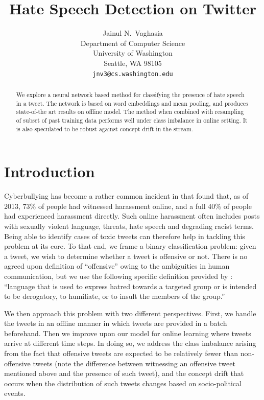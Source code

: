 \documentclass{article}
\title{Hate Speech Detection on Twitter}
\author{
    Jainul N.~Vaghasia\\
    Department of Computer Science\\
    University of Washington\\
    Seattle, WA 98105 \\
    \texttt{jnv3@cs.washington.edu}
  }
\begin{document}
  
  \maketitle

  \begin{abstract}
    We explore a neural network based method for classifying the presence of hate speech in a tweet.
    The network is based on word embeddings and mean pooling, and produces state-of-the art results on
    offline model. The method when combined with resampling of subset of past training data performs well
    under class imbalance in online setting. It is also speculated to be robust against concept drift in the stream.
  \end{abstract}
    
  \section{Introduction}
  Cyberbullying has become a rather common incident in that \citet{pew}
  found that, as of 2013, 73\% of people had witnessed harassment online, and a full
  40\% of people had experienced harassment directly. Such online harassment
  often includes posts with sexually violent language, threats, hate speech and degrading racist
  terms. Being able to identify cases of toxic tweets can therefore help in tackling this problem
  at its core. To that end, we frame a binary classification problem:
  given a tweet, we wish to determine whether a tweet is offensive or not. There is no
  agreed upon definition of ``offensive'' owing to the ambiguities in human communication, but we
  use the following specific definition provided by \citet{hateoffensive}: ``language that is used to express hatred towards
  a targeted group or is intended to be derogatory, to humiliate, or to insult the members of the group.''
  
  We then approach this problem with two different perspectives. First, we handle the tweets in
  an offline manner in which tweets are provided
  in a batch beforehand. Then we improve upon our model for online learning where
  tweets arrive at different time steps. In doing so, we address the class imbalance
  arising from the fact that offensive tweets are expected to be relatively fewer than non-offensive
  tweets (note the difference between witnessing an offensive tweet mentioned above and the presence
  of such tweet), and the concept drift that occurs when the distribution of such tweets changes
  based on socio-political events.
\end{document}
